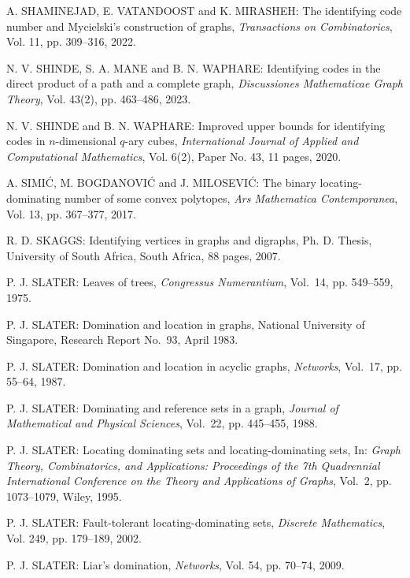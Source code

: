 \begin{thebibliography}{999}
A. SHAMINEJAD, E. VATANDOOST and K. MIRASHEH: The identifying code number and Mycielski's construction of graphs, {\it Transactions on Combinatorics}, Vol. 11, pp. 309--316, 2022.

N. V. SHINDE, S. A. MANE and B. N. WAPHARE: Identifying codes in the direct product of a path and a complete graph, {\it Discussiones Mathematicae Graph Theory}, Vol. 43(2), pp. 463--486, 2023.

N. V. SHINDE and B. N. WAPHARE: Improved upper bounds for identifying codes in $n$-dimensional $q$-ary cubes, {\it International Journal of Applied and Computational Mathematics}, Vol. 6(2), Paper No. 43, 11 pages, 2020.

A. SIMI\'C, M. BOGDANOVI\'C and J. MILOSEVI\'C: The binary locating-dominating number of some convex polytopes, {\it Ars Mathematica Contemporanea}, Vol. 13, pp. 367--377, 2017.    

R. D. SKAGGS: Identifying vertices in graphs and digraphs, Ph. D. Thesis, University of South Africa, South Africa, 88 pages, 2007.

P. J. SLATER: Leaves of trees, {\it Congressus Numerantium}, Vol.~14, pp. 549--559, 1975.

P. J. SLATER: Domination and location in graphs, National University of Singapore, Research Report No.~93, April 1983.

P. J. SLATER: Domination and location in acyclic graphs, {\it Networks}, Vol.~17, pp. 55--64, 1987.

P. J. SLATER: Dominating and reference sets in a graph, {\it Journal of Mathematical and Physical Sciences}, Vol.~22, pp. 445--455, 1988.

P. J. SLATER: Locating dominating sets and locating-dominating sets, In: {\it Graph Theory, Combinatorics, and Applications: Proceedings of the 7th Quadrennial International Conference on the Theory and Applications of Graphs}, Vol.~2, pp. 1073--1079, Wiley, 1995.

P. J. SLATER: Fault-tolerant locating-dominating sets, {\it Discrete Mathematics}, Vol. 249, pp. 179--189, 2002.

P. J. SLATER: Liar's domination, {\it Networks}, Vol. 54, pp. 70--74, 2009.


\end{thebibliography}

